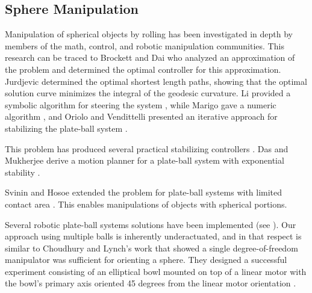 \documentclass[letter paper, 10pt, conference]{ieeeconf}
\begin{document}
\subsection{Sphere Manipulation}

Manipulation of spherical objects by rolling has been investigated in depth by members of the math, control, and robotic manipulation communities. %
 This research can be traced to Brockett and Dai who analyzed an approximation of the problem and determined the optimal controller for this approximation\cite{Brockett1993}.  
Jurdjevic determined the optimal shortest length paths, showing that the optimal solution curve minimizes the integral of the geodesic curvature\cite{Jurdjevic1993}. %
  Li provided a symbolic algorithm for steering the system \cite{Li1990}, while Marigo gave a numeric algorithm \cite{Marigo2000},
and Oriolo and Vendittelli presented an iterative approach for stabilizing the plate-ball system \cite{Oriolo2005}.  %

This problem has produced several practical stabilizing controllers \cite{Date 2004, Casagrande2009}. %
Das and Mukherjee derive a motion planner for a plate-ball system with exponential stability \cite{Das2004}.

Svinin and Hosoe extended the problem for plate-ball systems with limited contact area \cite{Svinin2008a}.  This enables manipulations of objects with spherical portions.  %

Several robotic plate-ball systems solutions have been implemented (see \cite{Marigo2000, Bicchi1995}).
Our approach using multiple balls is inherently underactuated, and in that respect is similar to Choudhury and Lynch's work that showed a single degree-of-freedom manipulator was sufficient for orienting a sphere.  They  designed a successful experiment consisting of an elliptical bowl mounted on top of a linear motor with the bowl's primary axis oriented 45 degrees from the linear motor orientation \cite{Choudhury2001}.


   
\end{document}
